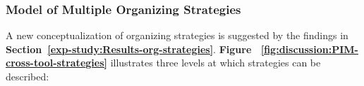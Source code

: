 \subsubsection{Model of Multiple Organizing Strategies}
\label{exp-study:multiple-strategies-model}
A new conceptualization of organizing strategies is suggested by the findings in \textbf{Section~\ref{exp-study:Results-org-strategies}}. 
\textbf{Figure ~\ref{fig:discussion:PIM-cross-tool-strategies}} illustrates three levels at which strategies can be described:
